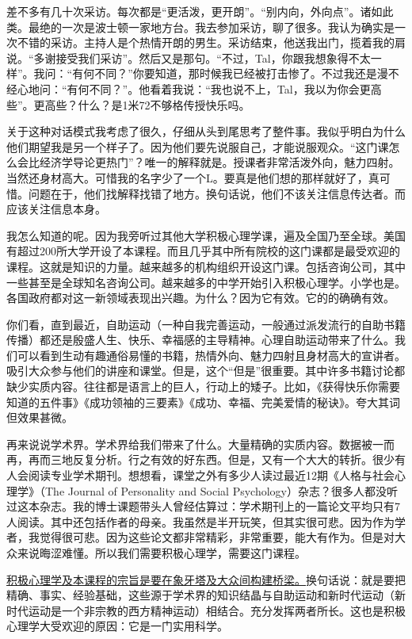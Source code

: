 差不多有几十次采访。每次都是“更活泼，更开朗”。“别内向，外向点”。诸如此类。最绝的一次是波士顿一家地方台。我去参加采访，聊了很多。我认为确实是一次不错的采访。主持人是个热情开朗的男生。采访结束，他送我出门，揽着我的肩说。“多谢接受我们采访”。然后又是那句。“不过，Tal，你跟我想象得不太一样”。我问：“有何不同？”你要知道，那时候我已经被打击惨了。不过我还是漫不经心地问：“有何不同？”。他看着我说：“我也说不上，Tal，我以为你会更高些”。更高些？什么？是1米72不够格传授快乐吗。

关于这种对话模式我考虑了很久，仔细从头到尾思考了整件事。我似乎明白为什么他们期望我是另一个样子了。因为他们要先说服自己，才能说服观众。“这门课怎么会比经济学导论更热门”？唯一的解释就是。授课者非常活泼外向，魅力四射。当然还身材高大。可惜我的名字少了一个L。要真是他们想的那样就好了，真可惜。问题在于，他们找解释找错了地方。换句话说，他们不该关注信息传达者。而应该关注信息本身。

我怎么知道的呢。因为我旁听过其他大学积极心理学课，遍及全国乃至全球。美国有超过200所大学开设了本课程。而且几乎其中所有院校的这门课都是最受欢迎的课程。这就是知识的力量。越来越多的机构组织开设这门课。包括咨询公司，其中一些甚至是全球知名咨询公司。越来越多的中学开始引入积极心理学。小学也是。各国政府都对这一新领域表现出兴趣。为什么？因为它有效。它的的确确有效。

你们看，直到最近，自助运动（一种自我完善运动，一般通过派发流行的自助书籍传播）都还是殷盛人生、快乐、幸福感的主导精神。心理自助运动带来了什么。我们可以看到生动有趣通俗易懂的书籍，热情外向、魅力四射且身材高大的宣讲者。吸引大众参与他们的讲座和课堂。但是，这个“但是”很重要。其中许多书籍讨论都缺少实质内容。往往都是语言上的巨人，行动上的矮子。比如，《获得快乐你需要知道的五件事》《成功领袖的三要素》《成功、幸福、完美爱情的秘诀》。夸大其词但效果甚微。

再来说说学术界。学术界给我们带来了什么。大量精确的实质内容。数据被一而再，再而三地反复分析。行之有效的好东西。但是，又有一个大大的转折。很少有人会阅读专业学术期刊。想想看，课堂之外有多少人读过最近12期《人格与社会心理学》（The Journal of Personality and Social Psychology）杂志？很多人都没听过这本杂志。我的博士课题带头人曾经估算过：学术期刊上的一篇论文平均只有7人阅读。其中还包括作者的母亲。我虽然是半开玩笑，但其实很可悲。因为作为学者，我觉得很可悲。因为这些论文都非常精彩，非常重要，能大有作为。但是对大众来说晦涩难懂。所以我们需要积极心理学，需要这门课程。

\uline{积极心理学及本课程的宗旨是要在象牙塔及大众间构建桥梁。}换句话说：就是要把精确、事实、经验基础，这些源于学术界的知识结晶与自助运动和新时代运动（新时代运动是一个非宗教的西方精神运动）相结合。充分发挥两者所长。这也是积极心理学大受欢迎的原因：它是一门实用科学。

